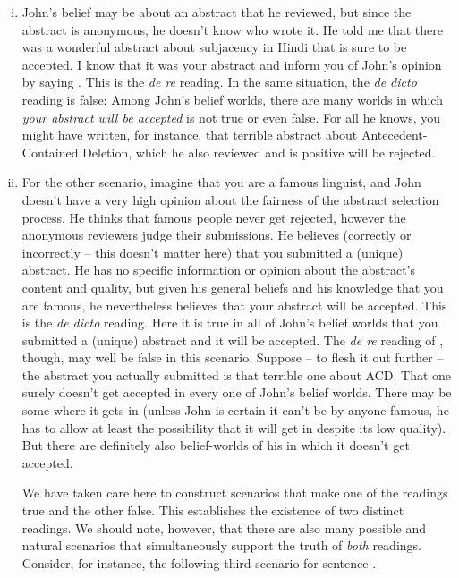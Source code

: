 \begin{enumerate}[(i)]
	
	\item John's belief may be about an abstract that he reviewed, but since the abstract is anonymous, he doesn't know who wrote it. He told me that there was a wonderful abstract about subjacency in Hindi that is sure to be accepted. I know that it was your abstract and inform you of John's opinion by saying \Last. This is the \emph{de re} reading. In the same situation, the \emph{de dicto} reading is false: Among John's belief worlds, there are many worlds in which \emph{your abstract will be accepted} is not true or even false. For all he knows, you might have written, for instance, that terrible abstract about Antecedent-Contained Deletion, which he also reviewed and is positive will be rejected.
	
	\item For the other scenario, imagine that you are a famous linguist, and John doesn't have a very high opinion about the fairness of the abstract selection process. He thinks that famous people never get rejected, however the anonymous reviewers judge their submissions. He believes (correctly or incorrectly -- this doesn't matter here) that you submitted a (unique) abstract. He has no specific information or opinion about the abstract's content and quality, but given his general beliefs and his knowledge that you are famous, he nevertheless believes that your abstract will be accepted. This is the \emph{de dicto} reading. Here it is true in all of John's belief worlds that you submitted a (unique) abstract and it will be accepted. The \emph{de re} reading of \Last, though, may well be false in this scenario. Suppose -- to flesh it out further -- the abstract you actually submitted is that terrible one about ACD. That one surely doesn't get accepted in every one of John's belief worlds. There may be some where it gets in (unless John is certain it can't be by anyone famous, he has to allow at least the possibility that it will get in despite its low quality). But there are definitely also belief-worlds of his in which it doesn't get accepted.
	
	We have taken care here to construct scenarios that make one of the readings true and the other false. This establishes the existence of two distinct readings. We should note, however, that there are also many possible and natural scenarios that simultaneously support the truth of \emph{both} readings. Consider, for instance, the following third scenario for sentence \Last.
	

\end{enumerate}

